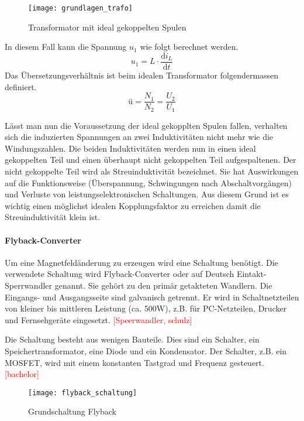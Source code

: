 \begin{figure}[H]
	\centering
	\texttt{[image: grundlagen\_trafo]}
	\caption{Transformator mit ideal gekoppelten Spulen}\label{fig:trafo}
\end{figure}

In diesem Fall kann die Spannung $ u_{1} $ wie folgt berechnet werden.
\begin{equation}\label{eq:induktionsspannung}
u_{1}=L \cdot \frac{\mathrm{d} i_{L}}{\mathrm{d} t}
\end{equation}
Das Übersetzungsverhältnis ist beim idealen Transformator folgendermassen definiert.
\begin{equation}\label{eq:übertragung}
ü= \frac{N_{1}}{N_{2}} = \frac{U_{2}}{U_{1}}
\end{equation}

Lässt man nun die Voraussetzung der ideal gekopplten Spulen fallen, verhalten sich die induzierten Spannungen an zwei Induktivitäten nicht mehr wie die Windungszahlen. Die beiden Induktivitäten werden nun in einen ideal gekoppelten Teil und einen überhaupt nicht gekoppelten Teil aufgespaltenen. Der nicht gekoppelte Teil wird als Streuinduktivität bezeichnet. Sie hat Auswirkungen auf die Funktionsweise (Überspannung, Schwingungen nach Abschaltvorgängen) und Verluste von leistungselektronischen Schaltungen. Aus diesem Grund ist es wichtig einen möglichst idealen Kopplungsfaktor zu erreichen damit die Streuinduktivität klein ist. 

\paragraph{Flyback-Converter}
Um eine Magnetfeldänderung zu erzeugen wird eine Schaltung benötigt. Die verwendete Schaltung wird Flyback-Converter oder auf Deutsch Eintakt-Sperrwandler genannt. Sie gehört zu den primär getakteten Wandlern. Die Eingangs- und Ausgangsseite sind galvanisch getrennt. Er wird in Schaltnetzteilen von kleiner bis mittleren Leistung (ca. 500W), z.B. für PC-Netzteilen, Drucker und Fernsehgeräte eingesetzt. \textcolor{red}{[Speerwandler, schulz]}

Die Schaltung besteht aus wenigen Bauteile. Dies sind ein Schalter, ein Speichertransformator, eine Diode und ein Kondensator. Der Schalter, z.B. ein MOSFET, wird mit einem konstanten Tastgrad und Frequenz gesteuert. \textcolor{red}{[bachelor]}

\begin{figure}[H]
\centering
\texttt{[image: flyback\_schaltung]}
\caption{Grundschaltung Flyback}\label{fig:flyback_schaltung}
\end{figure}

